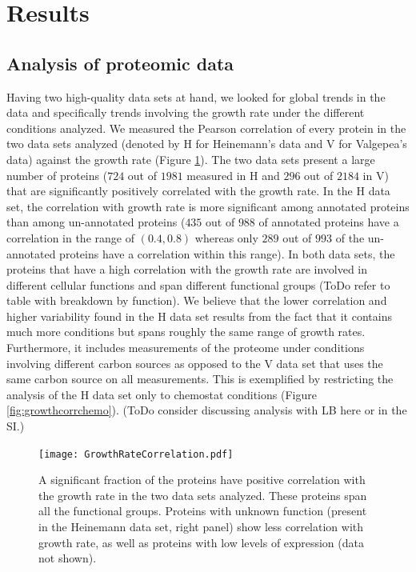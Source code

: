 \documentclass[notitlepage]{article}
\begin{document}
\section{Results}
\subsection{Analysis of proteomic data}
Having two high-quality data sets at hand, we looked for global trends in the data and specifically trends involving the growth rate under the different conditions analyzed.
We measured the Pearson correlation of every protein in the two data sets analyzed (denoted by H for Heinemann's data and V for Valgepea's data) against the growth rate (Figure \ref{fig:growthcorr}).
The two data sets present a large number of proteins ($724$ out of $1981$ measured in H and $296$ out of $2184$ in V) that are significantly positively correlated with the growth rate.
In the H data set, the correlation with growth rate is more significant among annotated proteins than among un-annotated proteins ($435$ out of $988$ of annotated proteins have a correlation in the range of $(0.4,0.8)$ whereas only $289$ out of $993$ of the un-annotated proteins have a correlation within this range).
In both data sets, the proteins that have a high correlation with the growth rate are involved in different cellular functions and span different functional groups (ToDo refer to table with breakdown by function).
We believe that the lower correlation and higher variability found in the H data set results from the fact that it contains much more conditions but spans roughly the same range of growth rates.
Furthermore, it includes measurements of the proteome under conditions involving different carbon sources as opposed to the V data set that uses the same carbon source on all measurements.
This is exemplified by restricting the analysis of the H data set only to chemostat conditions (Figure \ref{fig:growthcorrchemo}).
(ToDo consider discussing analysis with LB here or in the SI.)

\begin{figure}[h]
\centering
\texttt{[image: GrowthRateCorrelation.pdf]}
\caption{
A significant fraction of the proteins have positive correlation with the growth rate in the two data sets analyzed.
These proteins span all the functional groups.
Proteins with unknown function (present in the Heinemann data set, right panel) show less correlation with growth rate, as well as proteins with low levels of expression (data not shown).
}
\label{fig:growthcorr}
\end{figure}
\end{document}
